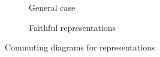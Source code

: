 \begin{figure}[h]
    \begin{subfigure}{.5 \textwidth}
        \centering
        \caption{General case}
        \label{fig:main.what.rep-cd}
    \end{subfigure}
    \begin{subfigure}{.5 \textwidth}
        \centering
        \caption{Faithful representations}
        \label{fig:main.what.faith-rep-cd}
    \end{subfigure}
    \caption{Commuting diagrams for representations}
\end{figure}
